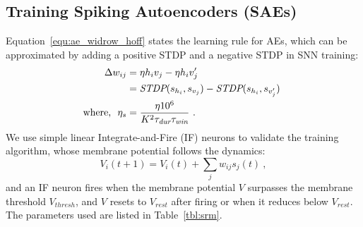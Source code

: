\subsection{Training Spiking Autoencoders (SAEs)}
\label{subsec:exp_SAE}
Equation~\ref{equ:ae_widrow_hoff} states the learning rule for AEs, which can be approximated by adding a positive STDP and a negative STDP in SNN training:
\begin{equation}
\label{equ:sae}
\begin{aligned}
\Delta w_{ij} &= \eta h_i v_j - \eta h_i v'_j \\
&= \textit{\textrm{STDP}}(s_{h_i}, s_{v_j}) - \textit{\textrm{STDP}}(s_{h_i}, s_{v'_j})~ \\
\textrm{where,~~} \eta_{s} &=  \frac{\eta 10^6}{K^2 \tau_{\textit{\textrm{dur}}} \tau_{\textit{\textrm{win}}}}~.
\end{aligned} 
\end{equation}
We use simple linear Integrate-and-Fire (IF) neurons to validate the training algorithm, whose membrane potential follows the dynamics:
\begin{equation}
V_i(t+1)=V_i(t) + \sum_j w_{ij} s_j(t)~,
\end{equation}
and an IF neuron fires when the membrane potential $V$ surpasses the membrane threshold $V_{thresh}$, and $V$ resets to $V_{rest}$ after firing or when it reduces below $V_{rest}$.
The parameters used are listed in Table~\ref{tbl:srm}.

